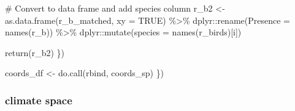 \documentclass[
  letterpaper,
  DIV=11,
  numbers=noendperiod]{scrreprt}
\newenvironment{Shaded}{\begin{snugshade}}{\end{snugshade}}
\newcommand{\AttributeTok}[1]{\textcolor[rgb]{0.40,0.45,0.13}{#1}}
\newcommand{\CommentTok}[1]{\textcolor[rgb]{0.37,0.37,0.37}{#1}}
\newcommand{\ConstantTok}[1]{\textcolor[rgb]{0.56,0.35,0.01}{#1}}
\newcommand{\FunctionTok}[1]{\textcolor[rgb]{0.28,0.35,0.67}{#1}}
\newcommand{\NormalTok}[1]{\textcolor[rgb]{0.00,0.23,0.31}{#1}}
\newcommand{\OtherTok}[1]{\textcolor[rgb]{0.00,0.23,0.31}{#1}}
\newcommand{\SpecialCharTok}[1]{\textcolor[rgb]{0.37,0.37,0.37}{#1}}
\begin{document}
\begin{Shaded}
\begin{Highlighting}[]
    \CommentTok{\# Convert to data frame and add species column}
\NormalTok{    r\_b2 }\OtherTok{\textless{}{-}} \FunctionTok{as.data.frame}\NormalTok{(r\_b\_matched, }\AttributeTok{xy =} \ConstantTok{TRUE}\NormalTok{) }\SpecialCharTok{\%\textgreater{}\%}
\NormalTok{      dplyr}\SpecialCharTok{::}\FunctionTok{rename}\NormalTok{(}\AttributeTok{Presence =} \FunctionTok{names}\NormalTok{(r\_b)) }\SpecialCharTok{\%\textgreater{}\%}
\NormalTok{      dplyr}\SpecialCharTok{::}\FunctionTok{mutate}\NormalTok{(}\AttributeTok{species =} \FunctionTok{names}\NormalTok{(r\_birds)[i])}

    \FunctionTok{return}\NormalTok{(r\_b2)}
\NormalTok{  \})}

\NormalTok{  coords\_df }\OtherTok{\textless{}{-}} \FunctionTok{do.call}\NormalTok{(rbind, coords\_sp)}
\NormalTok{\})}
\end{Highlighting}
\end{Shaded}

\hypertarget{climate-space}{%
\subsubsection{climate space}\label{climate-space}}
\end{document}
